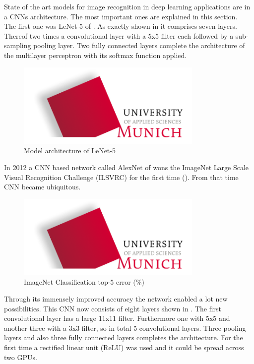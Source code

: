 	State of the art models for image recognition in deep learning applications are in a CNNs architecture. The most important ones are explained in this section. \\
	The first one was LeNet-5 of \citet{LeCun1998}. As exactly shown in  it comprises seven layers. Thereof two times a convolutional layer with a 5x5 filter each followed by a sub-sampling pooling layer. Two fully connected layers complete the architecture of the multilayer perceptron with its softmax function applied.
	
\begin{figure}[htbp]
\includegraphics[width=0.8\textwidth]{includes/MUASlogo}
\caption[Model architecture of LeNet-5]{Model architecture of LeNet-5 \citep{LeCun1998}}
\label{fig:FH-Logo0}
\end{figure} 

In 2012 a CNN based network called AlexNet of \citet{Krizhevsky2012} wons the ImageNet Large Scale Visual Recognition Challenge (ILSVRC) for the first time (). From that time CNN became ubiquitous.
\begin{figure}[htbp]
\includegraphics[width=0.8\textwidth]{includes/MUASlogo}
\caption[ImageNet Classification top-5 error]{ImageNet Classification top-5 error (\%) \citep{He2016}}
\label{fig:FH-Logo1}
\end{figure}
Through its immensely improved accuracy the network enabled a lot new possibilities. This CNN now consists of eight layers shown in . The first convolutional layer has a large 11x11 filter. Furthermore one with 5x5 and another three with a 3x3 filter, so in total 5 convolutional layers. Three pooling layers and also three fully connected layers completes the architecture. For the first time a rectified linear unit (ReLU) was used and it could be spread across two GPUs.

